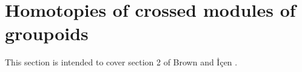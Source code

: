 
\section{Homotopies of crossed modules of groupoids}

This section is intended to cover section 2 of
Brown and \.{I}\c{c}en \cite{brow:icen}.


